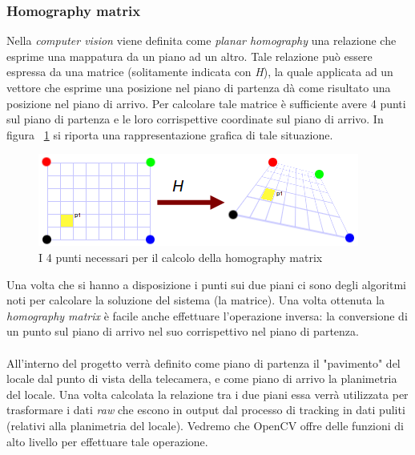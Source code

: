 \subsubsection{Homography matrix}

Nella \textit{computer vision} viene definita come \textit{planar homography} una relazione che esprime una mappatura da un piano ad un altro. Tale relazione può essere espressa da una matrice (solitamente indicata con \textit{H}), la quale applicata ad un vettore che esprime una posizione nel piano di partenza dà come risultato una posizione nel piano di arrivo. Per calcolare tale matrice è sufficiente avere 4 punti sul piano di partenza e le loro corrispettive coordinate sul piano di arrivo. In figura ~\ref{fig:track2} si riporta una rappresentazione grafica di tale situazione.
\begin{figure}[htpb] 
\centering 
\includegraphics[scale=1.0]{./images/track2.png} 
\caption{I 4 punti necessari per il calcolo della homography matrix} 
\label{fig:track2}
\end{figure} 

Una volta che si hanno a disposizione i punti sui due piani ci sono degli algoritmi noti per calcolare la soluzione del sistema (la matrice). Una volta ottenuta la \textit{homography matrix} è facile anche effettuare l'operazione inversa: la conversione di un punto sul piano di arrivo nel suo corrispettivo nel piano di partenza.  \\ \\
All'interno del progetto verrà definito come piano di partenza il "pavimento" del locale dal punto di vista della telecamera, e come piano di arrivo la planimetria del locale. Una volta calcolata la relazione tra i due piani essa verrà utilizzata per trasformare i dati \textit{raw} che escono in output dal processo di tracking in dati puliti (relativi alla planimetria del locale).
Vedremo che OpenCV offre delle funzioni di alto livello per effettuare tale operazione.

